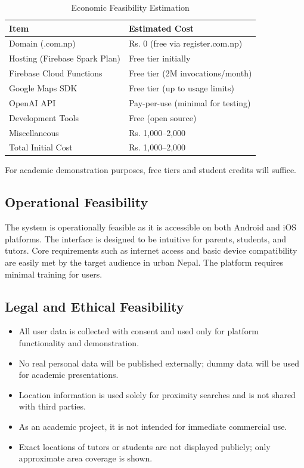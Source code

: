 \documentclass[12pt]{report}
\begin{document}
\begin{table}[H]
\centering
\caption{Economic Feasibility Estimation}
\vspace{5pt}
\begin{tabular}{|l|l|}
\hline
Item & Estimated Cost \\
\hline
Domain (.com.np) & Rs. 0 (free via register.com.np) \\
Hosting (Firebase Spark Plan) & Free tier initially \\
Firebase Cloud Functions & Free tier (2M invocations/month) \\
Google Maps SDK & Free tier (up to usage limits) \\
OpenAI API & Pay-per-use (minimal for testing) \\
Development Tools & Free (open source) \\
Miscellaneous & Rs. 1,000--2,000 \\
\hline
Total Initial Cost & Rs. 1,000--2,000 \\
\hline
\end{tabular}
\end{table}

\noindent For academic demonstration purposes, free tiers and student credits will suffice.

\subsection{Operational Feasibility}

The system is operationally feasible as it is accessible on both Android and iOS platforms. The interface is designed to be intuitive for parents, students, and tutors. Core requirements such as internet access and basic device compatibility are easily met by the target audience in urban Nepal. The platform requires minimal training for users.

\subsection{Legal and Ethical Feasibility}

\begin{itemize}
\item All user data is collected with consent and used only for platform functionality and demonstration.
\item No real personal data will be published externally; dummy data will be used for academic presentations.
\item Location information is used solely for proximity searches and is not shared with third parties.
\item As an academic project, it is not intended for immediate commercial use.
\item Exact locations of tutors or students are not displayed publicly; only approximate area coverage is shown.
\end{itemize}
\end{document}
